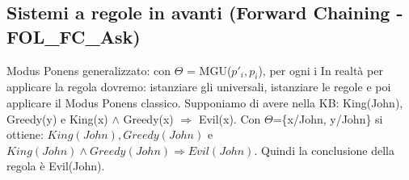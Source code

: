 \documentclass{article}
\begin{document}
\subsection{Sistemi a regole in avanti (Forward Chaining - FOL\_FC\_Ask)}
Modus Ponens generalizzato: \quad
{}
con $\Theta$ = MGU($p'_{i}, p_{i}$), per ogni i \newline
In realtà per applicare la regola dovremo: istanziare gli universali, istanziare le regole e poi applicare il Modus Ponens classico. \newline
Supponiamo di avere nella KB: King(John), Greedy(y) e King(x) $\land$ Greedy(x) $\Rightarrow$ Evil(x). \newline 
Con  $\Theta$=\{x/John, y/John\} si ottiene: \newline 
$King(John), Greedy(John)$ e $King(John) \land Greedy(John) \Rightarrow Evil(John)$. \newline 
Quindi la conclusione della regola è Evil(John).
\end{document}
